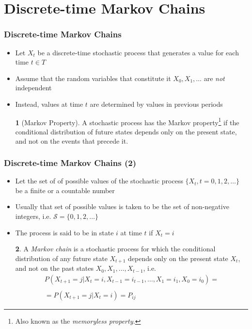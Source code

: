 \documentclass[10pt]{beamer}
\theoremstyle{definition}
\newtheorem{definition}{\translate{Definition}}
\begin{document}
\section{Discrete-time Markov Chains}
\begin{frame}[fragile]
	\frametitle{Discrete-time Markov Chains}
	\begin{itemize}
		\item Let $ X_{t} $ be a discrete-time stochastic process that generates a value for each time $ t \in T $
		
		\item Assume that the random variables that constitute it $ X_{0}, X_{1}, \ldots$ are \textit{not} independent 
		
		\item Instead, values at time $ t $ are determined by values in previous periods
		
		\begin{definition}[Markov Property]
			A stochastic process has the Markov property\footnote{Also known as the \textit{memoryless property.}} if the conditional distribution of future states depends only on the present state, and not on the events that precede it.
		\end{definition}
	\end{itemize}
\end{frame}

\begin{frame}[fragile]
	\frametitle{Discrete-time Markov Chains (2)}
	\begin{itemize}
		\item Let the set of of possible values of the stochastic process $ \{X_{t}, t = 0, 1, 2, \ldots \}$ be a finite or a countable number
		
		\item Usually that set of possible values is taken to be the set of non-negative integers, i.e. $ \mathcal{S} = \{0, 1, 2, \ldots\} $
		
		\item The process is said to be in state $ i $ at time $ t $ if $ X_{t} = i $
		
		\begin{definition}
			A \textit{Markov chain} is a stochastic process for which the conditional distribution of any future state $ X_{t+1} $ depends only on the present state $ X_{t} $, and not on the past states $ X_{0}, X_{1}, \ldots, X_{t-1} $, i.e.
			\[
				\begin{array}{lcl}
					P(X_{t+1} = j|X_{t} = i, X_{t-1} = i_{t-1}, \ldots, X_{1} = i_{1}, X_{0} = i_{0}) = \\
					\quad\\
					= P(X_{t+1} = j|X_{t} = i) = P_{ij}
				\end{array}
			\]
		\end{definition}
	\end{itemize}
\end{frame}
\end{document}
